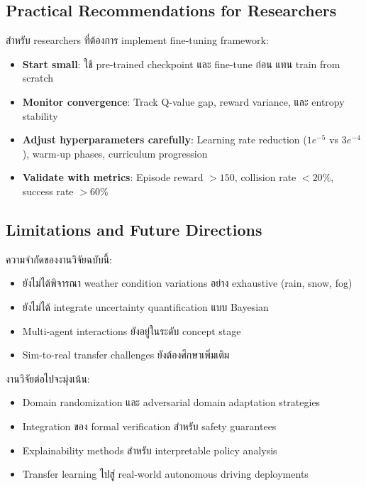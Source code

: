 \documentclass[10pt,a4paper,twocolumn]{article}
\begin{document}
\subsection{Practical Recommendations for Researchers}

สำหรับ researchers ที่ต้องการ implement fine-tuning framework:
\begin{itemize}
    \item \textbf{Start small}: ใช้ pre-trained checkpoint และ fine-tune ก่อน แทน train from scratch
    
    \item \textbf{Monitor convergence}: Track Q-value gap, reward variance, และ entropy stability
    
    \item \textbf{Adjust hyperparameters carefully}: Learning rate reduction ($1e^{-5}$ vs $3e^{-4}$), warm-up phases, curriculum progression
    
    \item \textbf{Validate with metrics}: Episode reward $> 150$, collision rate $< 20\%$, success rate $> 60\%$
\end{itemize}

\subsection{Limitations and Future Directions}

ความจำกัดของงานวิจัยฉบับนี้:
\begin{itemize}
    \item ยังไม่ได้พิจารณา weather condition variations อย่าง exhaustive (rain, snow, fog)
    
    \item ยังไม่ได้ integrate uncertainty quantification แบบ Bayesian
    
    \item Multi-agent interactions ยังอยู่ในระดับ concept stage
    
    \item Sim-to-real transfer challenges ยังต้องศึกษาเพิ่มเติม
\end{itemize}

งานวิจัยต่อไปจะมุ่งเน้น:
\begin{itemize}
    \item Domain randomization และ adversarial domain adaptation strategies
    
    \item Integration ของ formal verification สำหรับ safety guarantees
    
    \item Explainability methods สำหรับ interpretable policy analysis
    
    \item Transfer learning ไปสู่ real-world autonomous driving deployments
\end{itemize}
\end{document}
